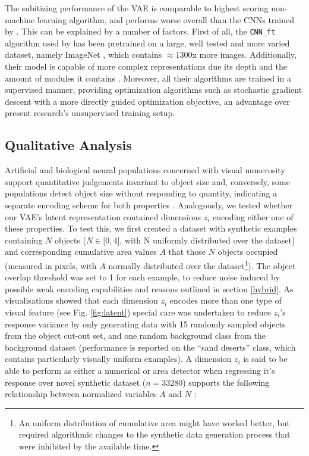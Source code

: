 \documentclass[twocolumn]{article}
\begin{document}

The subitizing performance of the VAE is comparable to highest scoring
non-machine learning algorithm, and performs worse overall than the CNNs
trained by \citet{zhang2016salient}. This can be explained by a number
of factors. First of all, the \texttt{CNN\_ft} algorithm used by
\citet{zhang2016salient} has been pretrained on a large, well tested and
more varied dataset, namely ImageNet \citep{russakovsky2015imagenet},
which contains \(\approx 1300\)x more images. Additionally, their model
is capable of more complex representations due its depth and the amount
of modules it contains \citep[the applied model from][ uses 22 compared
to the 12 in our approach]{szegedy2015going}. Moreover, all their
algorithms are trained in a supervised manner, providing optimization
algorithms such as stochastic gradient descent with a more directly
guided optimization objective, an advantage over present research's
unsupervised training setup.

\hypertarget{qualitative-analysis}{%
\subsection{Qualitative Analysis}\label{qualitative-analysis}}

Artificial and biological neural populations concerned with visual
numerosity support quantitative judgements invariant to object size and,
conversely, some populations detect object size without responding to
quantity, indicating a separate encoding scheme for both properties
\citep{stoianov2012, harvey2013topographic}. Analogously, we tested
whether our VAE's latent representation contained dimensions \(z_i\)
encoding either one of these properties. To test this, we first created
a dataset with synthetic examples containing \(N\) objects
(\(N \in \lbrack 0, 4\rbrack\), with N uniformly distributed over the
dataset) and corresponding cumulative area values \(A\) that those \(N\)
objects occupied (measured in pixels, with \(A\) normally distributed
over the dataset\footnote{An uniform distribution of cumulative area
  might have worked better, but required algorithmic changes to the
  synthetic data generation process that were inhibited by the available time.}). The object overlap threshold was set to 1 for
each example, to reduce noise induced by possible weak encoding
capabilities and reasons outlined in section
\ref{hybrid}. As visualisations showed that each dimension \(z_i\) encodes more
than one type of visual feature (see Fig. \ref{fig:latent}) special care was
undertaken to reduce \(z_i\)'s response variance by only generating data
with 15 randomly sampled objects from the object cut-out set, and one
random background class from the background dataset (performance is
reported on the ``sand deserts'' class, which contains particularly
visually uniform examples). A dimension \(z_i\) is said to be able to
perform as either a numerical or area detector when regressing it's
response over novel synthetic dataset (\(n=33280\)) supports the
following relationship between normalized variables \(A\) and \(N\)
\citep{stoianov2012}:
\end{document}
